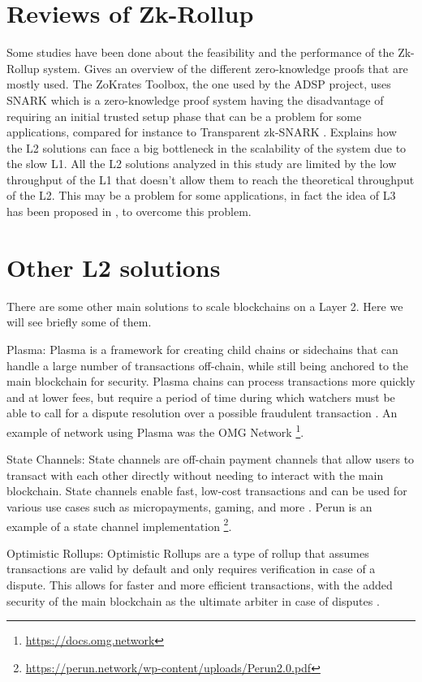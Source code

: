 \section{Reviews of Zk-Rollup}
Some studies have been done about the feasibility and the performance of the Zk-Rollup system. \cite{capko_state_2022} Gives an overview of the different zero-knowledge proofs that are mostly used. The ZoKrates Toolbox, the one used by the ADSP project, uses SNARK which is a zero-knowledge proof system having the disadvantage of requiring an initial trusted setup phase that can be a problem for some applications, compared for instance to Transparent zk-SNARK \cite{zhou_overview_2022}. \cite{neiheiser_practical_2023} Explains how the L2 solutions can face a big bottleneck in the scalability of the system due to the slow L1. All the L2 solutions analyzed in this study are limited by the low throughput of the L1 that doesn't allow them to reach the theoretical throughput of the L2. This may be a problem for some applications, in fact the idea of L3 has been proposed in \cite{starkware_fractal_2021}, to overcome this problem.

\section{Other L2 solutions}
There are some other main solutions to scale blockchains on a Layer 2. Here we will see briefly some of them.

Plasma: Plasma is a framework for creating child chains or sidechains that can handle a large number of transactions off-chain, while still being anchored to the main blockchain for security. Plasma chains can process transactions more quickly and at lower fees, but require a period of time during which watchers must be able to call for a dispute resolution over a possible fraudulent transaction \cite{thibault_blockchain_2022}. An example of network using Plasma was the OMG Network \footnote{\url{https://docs.omg.network}}.

State Channels: State channels are off-chain payment channels that allow users to transact with each other directly without needing to interact with the main blockchain. State channels enable fast, low-cost transactions and can be used for various use cases such as micropayments, gaming, and more \cite{negka_blockchain_2021}. Perun is an example of a state channel implementation \footnote{\url{https://perun.network/wp-content/uploads/Perun2.0.pdf}}.


Optimistic Rollups: Optimistic Rollups are a type of rollup that assumes transactions are valid by default and only requires verification in case of a dispute. This allows for faster and more efficient transactions, with the added security of the main blockchain as the ultimate arbiter in case of disputes \cite{thibault_blockchain_2022}.
